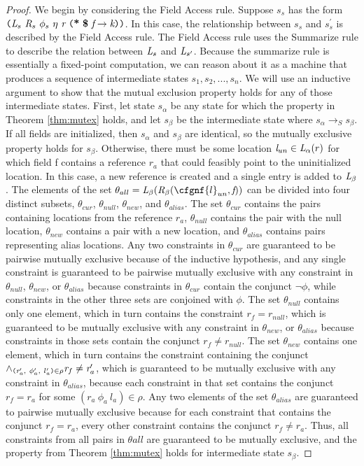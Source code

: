 \begin{proof}
We begin by considering the Field Access rule. Suppose $s_s$ has the form $\lp \cfgnt{L}_s\ \cfgnt{R}_{s}\ \phi_s\ \eta\ \cfgnt{r}\ \lp \cfgt{*}\ \cfgt{\$}\ \cfgnt{f} \rightarrow \cfgnt{k}\rp \rp$. In this case, the relationship between $s_s$ and $s_s^\prime$ is described by the Field Access rule. The Field Access rule uses the Summarize rule to describe the relation between $\emph{L}_{s}$ and $\emph{L}_{s^\prime}$. Because the summarize rule is essentially a fixed-point computation, we can reason about it as a machine that produces a sequence of intermediate states $s_1, s_2, ... , s_n$. We will use an inductive argument to show that the mutual exclusion property holds for any of those intermediate states. First, let state $s_\alpha$ be any state for which the property in Theorem \ref{thm:mutex} holds, and let $s_\beta$ be the intermediate state where $s_\alpha \rightarrow_S s_\beta$. If all fields are initialized, then $s_\alpha$ and $s_\beta$ are identical, so the mutually exclusive property holds for $s_\beta$. 
Otherwise, there must be some location $\emph{l}_{un} \in \emph{L}_\alpha(r)$ for which field f contains a reference $r_a$ that could feasibly point to the uninitialized location. In this case, a new reference is created and a single entry is added to $\emph{L}_\beta$. The elements of the set $\theta_{all} = \cfgnt{L}_\beta(\cfgnt{R}_\beta(\cfgnf{l}_{un},\cfgnt{f}))$ can be divided into four distinct subsets, $\theta_{cur}$, $\theta_{null}$, $\theta_{new}$, and $\theta_{alias}$. The set $\theta_{cur}$ contains the pairs containing locations from the reference $r_a$, $\theta_{null}$ contains the pair with the null location, $\theta_{new}$ contains a pair with a new location, and $\theta_{alias}$ contains pairs representing alias locations. Any two constraints in $\theta_{cur}$ are guaranteed to be pairwise mutually exclusive because of the inductive hypothesis, and any single constraint is guaranteed to be pairwise mutually exclusive with any constraint in $\theta_{null}$, $\theta_{new}$, or $\theta_{alias}$ because constraints in $\theta_{cur}$ contain the conjunct $\neg \phi$, while constraints in the other three sets are conjoined with $\phi$. The set $\theta_{null}$ contains only one element, which in turn contains the constraint $r_f = r_{null}$, which is guaranteed to be mutually exclusive with any constraint in $\theta_{new}$, or $\theta_{alias}$ because constraints in those sets contain the conjunct $r_f \neq r_{null}$. The set $\theta_{new}$ contains one element, which in turn contains the constraint containing the conjunct $ \wedge_{\lp \cfgnt{r}^\prime_a,\ \phi^\prime_a,\ l^\prime_a\rp  \in \rho} \cfgnt{r}_f \ne \cfgnt{r}^\prime_a$, which is guaranteed to be mutually exclusive with any constraint in $\theta_{alias}$, because each constraint in that set contains the conjunct $r_f = r_a$ for some $(r_a\ \phi_a\ l_a)\in \rho$. Any two elements of the set $\theta_{alias}$ are guaranteed to pairwise mutually exclusive because for each constraint that contains the conjunct $r_f = r_a$, every other constraint contains the conjunct $r_f \ne r_a$. Thus, all constraints from all pairs in $\theta{all}$ are guaranteed to be mutually exclusive, and the property from Theorem \ref{thm:mutex} holds for intermediate state $s_\beta$. 


\end{proof}
